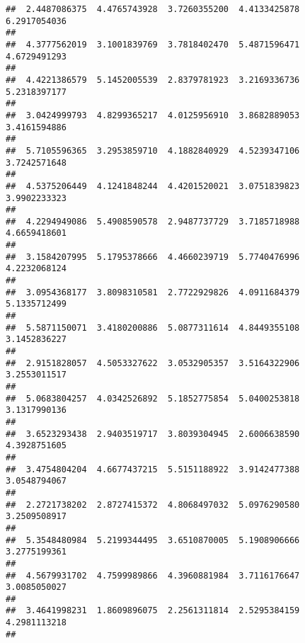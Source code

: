 \documentclass[]{article}
\begin{document}
\begin{verbatim}
##  2.4487086375  4.4765743928  3.7260355200  4.4133425878  6.2917054036 
##                                                                       
##  4.3777562019  3.1001839769  3.7818402470  5.4871596471  4.6729491293 
##                                                                       
##  4.4221386579  5.1452005539  2.8379781923  3.2169336736  5.2318397177 
##                                                                       
##  3.0424999793  4.8299365217  4.0125956910  3.8682889053  3.4161594886 
##                                                                       
##  5.7105596365  3.2953859710  4.1882840929  4.5239347106  3.7242571648 
##                                                                       
##  4.5375206449  4.1241848244  4.4201520021  3.0751839823  3.9902233323 
##                                                                       
##  4.2294949086  5.4908590578  2.9487737729  3.7185718988  4.6659418601 
##                                                                       
##  3.1584207995  5.1795378666  4.4660239719  5.7740476996  4.2232068124 
##                                                                       
##  3.0954368177  3.8098310581  2.7722929826  4.0911684379  5.1335712499 
##                                                                       
##  5.5871150071  3.4180200886  5.0877311614  4.8449355108  3.1452836227 
##                                                                       
##  2.9151828057  4.5053327622  3.0532905357  3.5164322906  3.2553011517 
##                                                                       
##  5.0683804257  4.0342526892  5.1852775854  5.0400253818  3.1317990136 
##                                                                       
##  3.6523293438  2.9403519717  3.8039304945  2.6006638590  4.3928751605 
##                                                                       
##  3.4754804204  4.6677437215  5.5151188922  3.9142477388  3.0548794067 
##                                                                       
##  2.2721738202  2.8727415372  4.8068497032  5.0976290580  3.2509508917 
##                                                                       
##  5.3548480984  5.2199344495  3.6510870005  5.1908906666  3.2775199361 
##                                                                       
##  4.5679931702  4.7599989866  4.3960881984  3.7116176647  3.0085050027 
##                                                                       
##  3.4641998231  1.8609896075  2.2561311814  2.5295384159  4.2981113218 
##                                                                       

\end{verbatim}
\end{document}
